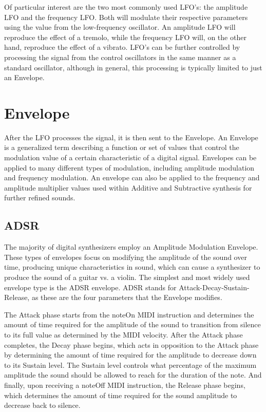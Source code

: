 \documentclass[a4paper,12pt]{report}
\begin{document}
Of particular interest are the two most commonly used LFO's: the amplitude LFO and the frequency LFO. Both will modulate their respective parameters using the value from the low-frequency oscillator. An amplitude LFO will reproduce the effect of a tremolo, while the frequency LFO will, on the other hand, reproduce the effect of a vibrato. LFO's can be further controlled by processing the signal from the control oscillators in the same manner as a standard oscillator, although in general, this processing is typically limited to just an Envelope.

\section{Envelope}
After the LFO processes the signal, it is then sent to the Envelope. An Envelope is a generalized term describing a function or set of values that control the modulation value of a certain characteristic of a digital signal. Envelopes can be applied to many different types of modulation, including amplitude modulation and frequency modulation. An envelope can also be applied to the frequency and amplitude multiplier values used within Additive and Subtractive synthesis for further refined sounds.

\subsection{ADSR}
The majority of digital synthesizers employ an Amplitude Modulation Envelope. These types of envelopes focus on modifying the amplitude of the sound over time, producing unique characteristics in sound, which can cause a synthesizer to produce the sound of a guitar vs. a violin. The simplest and most widely used envelope type is the ADSR envelope. ADSR stands for Attack-Decay-Sustain-Release, as these are the four parameters that the Envelope modifies.

The Attack phase starts from the noteOn MIDI instruction and determines the amount of time required for the amplitude of the sound to transition from silence to its full value as determined by the MIDI velocity. After the Attack phase completes, the Decay phase begins, which acts in opposition to the Attack phase by determining the amount of time required for the amplitude to decrease down to its Sustain level. The Sustain level controls what percentage of the maximum amplitude the sound should be allowed to reach for the duration of the note. And finally, upon receiving a noteOff MIDI instruction, the Release phase begins, which determines the amount of time required for the sound amplitude to decrease back to silence.
\end{document}
